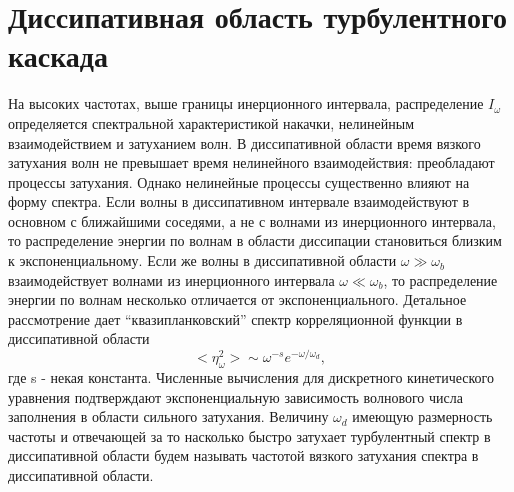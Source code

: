\section{Диссипативная область турбулентного каскада}%

На высоких частотах, выше границы инерционного интервала, распределение $I_\omega$ определяется спектральной характеристикой накачки, нелинейным взаимодействием и затуханием волн. В диссипативной области время вязкого затухания волн не превышает время нелинейного взаимодействия: преобладают процессы затухания. Однако нелинейные процессы существенно влияют на форму спектра. Если волны в диссипативном интервале взаимодействуют в основном с ближайшими соседями, а не с волнами из инерционного интервала, то распределение энергии по волнам в области диссипации становиться близким к экспоненциальному.
Если же волны в диссипативной области $\omega \gg \omega_b$ взаимодействует волнами из инерционного интервала $\omega \ll \omega_b$, то распределение энергии по волнам несколько отличается от экспоненциального. Детальное рассмотрение дает “квазипланковский” спектр корреляционной функции в диссипативной области  \cite{Ryzhenkova1990}
\begin{equation}
<\eta_\omega^2> \sim \omega^{-s} e^{-\omega/\omega_d},
\end{equation}			
где s - некая константа. Численные вычисления для дискретного кинетического уравнения \cite{Ryzhenkova1990} подтверждают экспоненциальную зависимость волнового числа заполнения в области сильного затухания. Величину $\omega_d$ имеющую размерность частоты и отвечающей за то насколько быстро затухает турбулентный спектр в диссипативной области будем называть частотой вязкого затухания спектра в диссипативной области.
	

